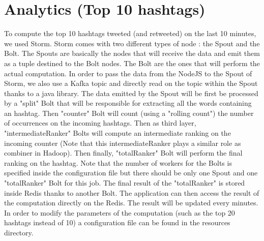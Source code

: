 \documentclass[conference,9pt]{IEEEtran}
\begin{document}
\section{Analytics (Top 10 hashtags)}
To compute the top 10 hashtags tweeted (and retweeted) on the last 10 minutes, we used Storm. Storm comes with two different types of node : the Spout and the Bolt. The Spouts are basically the nodes that will receive the data and emit them as a tuple destined to the Bolt nodes. The Bolt are the ones that will perform the actual computation. In order to pass the data from the NodeJS to the Spout of Storm, we also use a Kafka topic and directly read on the topic within the Spout thanks to a java library. The data emitted by the Spout will be first be processed by a "split" Bolt that will be responsible for extracting all the words containing an hashtag. Then "counter" Bolt will count (using a "rolling count") the number of occurrences on the incoming hashtags. Then as third layer,  "intermediateRanker" Bolts will compute an intermediate ranking on the incoming counter (Note that this intermediateRanker plays a similar role as combiner in Hadoop). Then finally, "totalRanker" Bolt will perform the final ranking on the hashtag. Note that the number of workers for the Bolts is specified inside the configuration file but there should be only one Spout and one "totalRanker" Bolt for this job. The final result of the "totalRanker" is stored inside Redis thanks to another Bolt.
The application can then access the result of the computation directly on the Redis. The result will be updated every minutes. In order to modify the parameters of the computation (such as the top 20 hashtags instead of 10) a configuration file can be found in the resources directory. 
%
%
\end{document}
